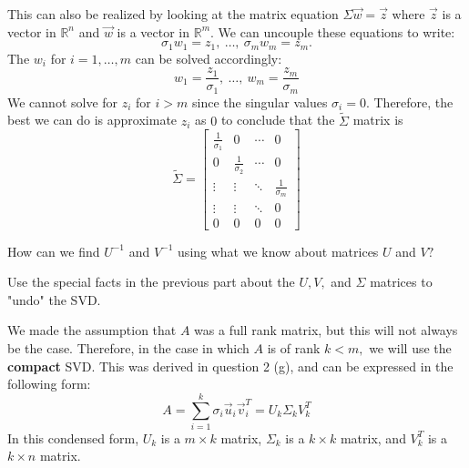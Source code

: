 \begin{enumerate}
{    This can also be realized by looking at the matrix equation $\Sigma \vec{w} = \vec{z}$ where $\vec{z}$ is a vector in $\mathbb{R}^{n}$ and $\vec{w}$ is a vector in $\mathbb{R}^{m}.$ 
    We can uncouple these equations to write:
    $$\sigma_{1} w_{1} = z_{1}, \ \dotsc, \  \sigma_{m} w_{m} = z_{m}.$$
    The $w_{i}$ for $i = 1,\ldots,m$ can be solved accordingly:
    $$w_{1} = \frac{z_{1}}{\sigma_{1}}, \ \dotsc, \ w_{m} = \frac{z_{m}}{\sigma_{m}}$$
    We cannot solve for $z_{i}$ for $i > m$ since the singular values $\sigma_{i} = 0.$ 
    Therefore, the best we can do is approximate $z_{i}$ as $0$ to conclude that the $\widetilde{\Sigma}$ matrix is
    $$\widetilde{\Sigma} = \begin{bmatrix} \frac{1}{\sigma_{1}} & 0 &  \cdots & 0 \\ 0 & \frac{1}{\sigma_{2}} & \cdots & 0 \\ \vdots & \vdots & \ddots & \frac{1}{\sigma_{m}} \\ 
    \vdots & \vdots & \ddots & 0 \\ 0 & 0 & 0 & 0 \end{bmatrix}$$

  }

  \qitem How can we find $U^{-1}$ and $V^{-1}$ using what we know about matrices $U$ and $V?$


  \qitem Use the special facts in the previous part about the $U, V,$ and $\Sigma$ matrices to "undo" the SVD.


  \qitem We made the assumption that $A$ was a full rank matrix, but this will not always be the case. Therefore, in the case in which $A$ is of rank $k < m,$ we will use the \textbf{compact} SVD. 
  This was derived in question 2 (g), and can be expressed in the following form:
  \begin{equation}
    A = \sum\limits_{i=1}^{k} \sigma_{i} \vec{u}_{i} \vec{v}_{i}^{T} = U_{k} \Sigma_{k} V_{k}^{T}
  \end{equation}
  In this condensed form, $U_{k}$ is a $m \times k$ matrix, $\Sigma_{k}$ is a $k \times k$ matrix, and $V_{k}^{T}$ is a $k \times n$ matrix.


\end{enumerate}
